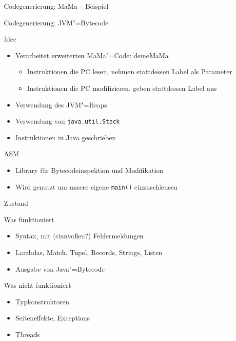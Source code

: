 \documentclass[hyperref={pdfpagelabels=false}]{beamer}
\begin{document}
\begin{frame}{Codegenerierung: MaMa -- Beispiel}
%  
\end{frame}

\begin{frame}{Codegenerierung: JVM"=Bytecode}
  \begin{block}{Idee}
    \begin{itemize}
      \item Verarbeitet erweiterten MaMa"=Code: deineMaMa
        \begin{itemize}
          \item Instruktionen die PC lesen, nehmen stattdessen Label als Parameter
          \item Instruktionen die PC modifizieren, geben stattdessen Label aus
        \end{itemize}
      \item Verwendung des JVM"=Heaps
      \item Verwendung von \texttt{java.util.Stack}
      \item Instruktionen in Java geschrieben
    \end{itemize}
  \end{block}
  \begin{block}{ASM}
    \begin{itemize}
      \item Library für Bytecodeinspektion und Modifikation
      \item Wird genutzt um unsere eigene \texttt{main()} einzuschleusen
    \end{itemize}
  \end{block}
\end{frame}

\begin{frame}{Zustand}
  \begin{exampleblock}{Was funktioniert}
    \begin{itemize}
      \item Syntax, mit (sinnvollen?) Fehlermeldungen
      \item Lambdas, Match, Tupel, Records, Strings, Listen
      \item Ausgabe von Java"=Bytecode
    \end{itemize}
  \end{exampleblock}
  \begin{alertblock}{Was nicht funktioniert}
    \begin{itemize}
      \item Typkonstruktoren
      \item Seiteneffekte, Exceptions
      \item Threads
    \end{itemize}
  \end{alertblock}
\end{frame}
\end{document}
